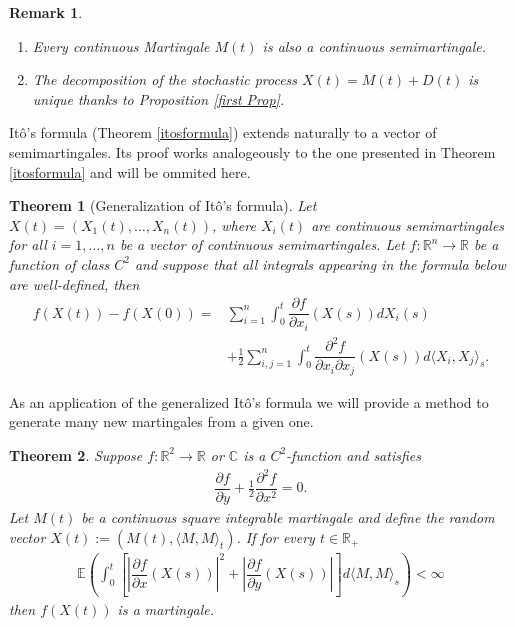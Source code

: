 \documentclass[11pt,a4paper, final]{article}
\newtheorem{thm}{Theorem}[section]
\newtheorem{rem}{Remark}[defn]
\begin{document}
\begin{rem}  \ 
\begin{enumerate} 
\item Every continuous Martingale $M(t)$ is also a continuous semimartingale. 
\item The decomposition of the stochastic process $X(t)=M(t) + D(t)$ is unique thanks to Proposition \ref{first Prop}. 
\end{enumerate} 
\end{rem}
\noindent Itô's formula (Theorem \ref{itosformula}) extends naturally to a vector of semimartingales. Its proof works analogeously to the one presented in Theorem \ref{itosformula} and will be ommited here.
\begin{thm}[Generalization of Itô's formula] Let $X(t) = (X_1(t), \dots , X_n(t))$, where $X_i(t)$ are continuous semimartingales for all $i=1, \dots ,n$ be a vector of continuous semimartingales. Let $f: \mathbb{R}^n \to \mathbb{R}$ be a function of class $C^2$ and suppose that all integrals appearing in the formula below are well-defined, then 
\begin{align*}
f(X(t))-f(X(0)) = & \sum_{i=1}^n \int_0^t \dfrac{\partial f}{\partial x_i} (X(s)) dX_i(s)
\\ & + \frac{1}{2} \sum_{i,j=1}^n \int_0^t \dfrac{\partial^2 f	}{\partial x_i \partial x_j}(X(s))d \langle X_i, X_j \rangle_s. 
\end{align*}
\end{thm}
\noindent As an application of the generalized Itô's formula we will provide a method to generate many new martingales from a given one. 
\newpage
\begin{thm} \label{fromitotomartingale} Suppose $f: \mathbb{R}^2 \to \mathbb{R}$ or $\mathbb{C}$ is a $C^2$-function and satisfies \begin{align*}
\dfrac{\partial f}{\partial y} + \frac{1}{2} \dfrac{\partial^2 f}{\partial x^2}= 0. 
\end{align*}
Let $M(t)$ be a continuous square integrable martingale and define the random vector $X(t):=(M(t), \langle M, M \rangle_t )$. If for every $t \in \mathbb{R}_+$ 
\begin{align*}
\mathbb{E} \left( \int_0^t \left[ \left| \dfrac{\partial f}{\partial x}(X(s)) \right|^2 + \left| \dfrac{\partial f}{\partial y} (X(s)) \right| \right] d \langle M, M \rangle_s \right) < \infty \tag{$\diamondsuit$}
\end{align*}
then $f(X(t))$ is a martingale. 
\end{thm}
\end{document}
